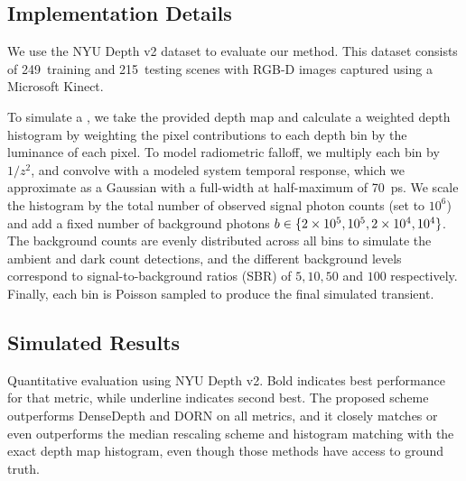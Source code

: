 


\subsection{Implementation Details}

We use the NYU Depth v2 dataset to evaluate our method. This dataset consists of
249~training and 215~testing scenes with RGB-D images captured using a Microsoft
Kinect.

To simulate a , we take the provided depth map and 
calculate a weighted depth histogram by weighting the pixel contributions to
each depth bin by the luminance of each pixel. To model radiometric falloff, we
multiply each bin by $1/z^2$, and convolve with a modeled system temporal
response, which we approximate as a Gaussian with a full-width at half-maximum of 70~ps. We scale
the histogram by the total number of observed signal photon counts (set to 
$10^6$) and  add a fixed number of background photons $b \in \{2\times 10^5, 10^5, 2\times
10^4, 10^4\}$. The background counts are evenly distributed across all bins to simulate the ambient and dark
count detections, and the different background levels correspond to
signal-to-background ratios (SBR) of $5, 10, 50$ and $100$ respectively. Finally,
each bin is Poisson sampled to produce the final simulated transient.

\subsection{Simulated Results}
\begin{table*}[!t]
\begin{center}

\caption{Quantitative evaluation using NYU Depth v2. Bold indicates best
performance for that metric, while underline indicates second best. The proposed
scheme outperforms DenseDepth and DORN on all metrics, and it closely matches or
even outperforms the median rescaling scheme and histogram matching with the
exact depth map histogram, even though those methods have access to ground
truth. }
\vspace{-2em}
\label{tab:comparison}
\end{center}
\end{table*}


